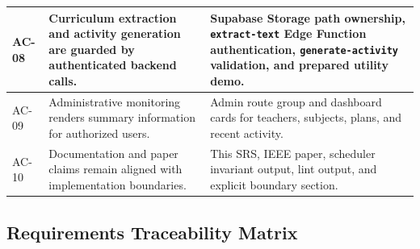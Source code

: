 \documentclass[12pt]{article}
\begin{document}
\begin{longtable}{|L{2.7cm}|L{5.4cm}|L{5.4cm}|}
\hline
AC-08 & Curriculum extraction and activity generation are guarded by authenticated backend calls. & Supabase Storage path ownership, \texttt{extract-text} Edge Function authentication, \texttt{generate-activity} validation, and prepared utility demo. \\
\hline
AC-09 & Administrative monitoring renders summary information for authorized users. & Admin route group and dashboard cards for teachers, subjects, plans, and recent activity. \\
\hline
AC-10 & Documentation and paper claims remain aligned with implementation boundaries. & This SRS, IEEE paper, scheduler invariant output, lint output, and explicit boundary section. \\
\hline
\end{longtable}

\subsection{Requirements Traceability Matrix}
\end{document}
